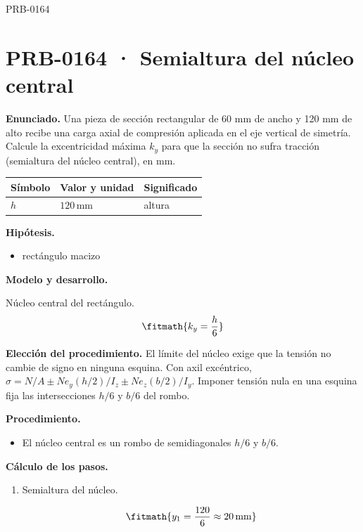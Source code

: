 \begin{studiumworked}{PRB-0164}

\section{PRB-0164 · Semialtura del núcleo central}

\textbf{Enunciado.} Una pieza de sección rectangular de 60 mm de ancho y 120 mm de alto recibe una carga axial de compresión aplicada en el eje vertical de simetría. Calcule la excentricidad máxima $k_y$ para que la sección no sufra tracción (semialtura del núcleo central), en mm.

\par\medskip\noindent\begin{tabular}{@{}p{.18\linewidth}p{.26\linewidth}p{.48\linewidth}@{}}
\toprule Símbolo & Valor y unidad & Significado\\\midrule
$h$ & $120\,\mathrm{mm}$ & altura\\
\bottomrule\end{tabular}\par\medskip

\textbf{Hipótesis.}\begin{itemize}\item rectángulo macizo\end{itemize}

\textbf{Modelo y desarrollo.}

Núcleo central del rectángulo.\[\fitmath{k_y = \frac{h}{6}}\]

\textbf{Elección del procedimiento.} El límite del núcleo exige que la tensión no cambie de signo en ninguna esquina. Con axil excéntrico, $\sigma=N/A\pm Ne_y(h/2)/I_z\pm Ne_z(b/2)/I_y$. Imponer tensión nula en una esquina fija las intersecciones $h/6$ y $b/6$ del rombo.

\textbf{Procedimiento.}\begin{itemize}\item El núcleo central es un rombo de semidiagonales $h/6$ y $b/6$.\end{itemize}

\textbf{Cálculo de los pasos.}

\begin{enumerate}

\item Semialtura del núcleo.

\[\fitmath{y_{1}=\frac{120}{6}\approx 20\,\mathrm{mm}}\]

\end{enumerate}


\end{studiumworked}

